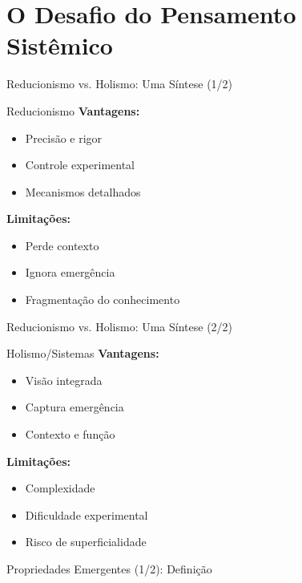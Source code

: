\section{O Desafio do Pensamento Sistêmico}

\begin{frame}{Reducionismo vs. Holismo: Uma Síntese (1/2)}
\begin{block}{Reducionismo}
\textbf{Vantagens:}
\begin{itemize}
    \item Precisão e rigor
    \item Controle experimental
    \item Mecanismos detalhados
\end{itemize}

\textbf{Limitações:}
\begin{itemize}
    \item Perde contexto
    \item Ignora emergência
    \item Fragmentação do conhecimento
\end{itemize}
\end{block}
\end{frame}

\begin{frame}{Reducionismo vs. Holismo: Uma Síntese (2/2)}
\begin{block}{Holismo/Sistemas}
\textbf{Vantagens:}
\begin{itemize}
    \item Visão integrada
    \item Captura emergência
    \item Contexto e função
\end{itemize}

\textbf{Limitações:}
\begin{itemize}
    \item Complexidade
    \item Dificuldade experimental
    \item Risco de superficialidade
\end{itemize}
\end{block}
\end{frame}

\begin{frame}{Propriedades Emergentes (1/2): Definição}

\vspace{0.5cm}

\end{frame}

